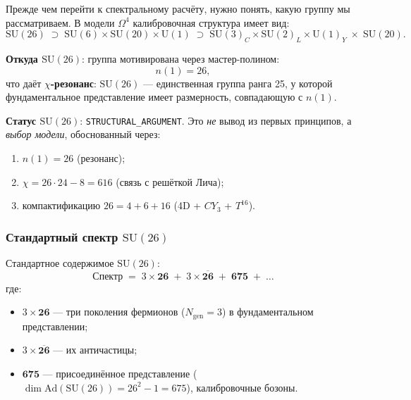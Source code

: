 \documentclass[11pt,a4paper]{article}
\newcommand{\SU}{\ensuremath{\mathrm{SU}}}
\newcommand{\Ad}{\ensuremath{\mathrm{Ad}}}
\newcommand{\CY}{\ensuremath{CY_3}}
\newcommand{\Om}{\ensuremath{\Omega^4}}
\newcommand{\Ngen}{\ensuremath{N_{\text{gen}}}}
\theoremstyle{definition}
\begin{document}
Прежде чем перейти к спектральному расчёту, нужно понять, какую
группу мы рассматриваем. В модели $\Om$ калибровочная структура
имеет вид:
\begin{equation}
    \SU(26) \;\supset\; \SU(6) \times \SU(20) \times \mathrm{U}(1)
    \;\supset\; \SU(3)_C \times \SU(2)_L \times \mathrm{U}(1)_Y
    \;\times\; \SU(20).
    \label{eq:su26-chain}
\end{equation}

\medskip\noindent
\textbf{Откуда $\SU(26)$}: группа мотивирована через
мастер-полином:
\begin{equation}
    n(1) = 26,
\end{equation}
что даёт \textbf{$\chi$-резонанс}: $\SU(26)$ --- единственная
группа ранга 25, у которой фундаментальное представление имеет
размерность, совпадающую с $n(1)$.

\medskip\noindent
\textbf{Статус $\SU(26)$}: \texttt{STRUCTURAL\_ARGUMENT}.
Это \emph{не} вывод из первых принципов, а \emph{выбор модели},
обоснованный через:
\begin{enumerate}
    \item $n(1) = 26$ (резонанс);
    \item $\chi = 26 \cdot 24 - 8 = 616$ (связь с решёткой Лича);
    \item компактификацию $26 = 4 + 6 + 16$ (4D + $\CY$ + $T^{16}$).
\end{enumerate}

\subsubsection{Стандартный спектр \texorpdfstring{$\SU(26)$}{(26)}}

Стандартное содержимое $\SU(26)$:
\begin{equation}
    \text{Спектр} \;=\; 3 \times \mathbf{26}
    \;+\; 3 \times \overline{\mathbf{26}}
    \;+\; \mathbf{675} \;+\; \ldots
    \label{eq:su26-spectrum}
\end{equation}
где:
\begin{itemize}
    \item $3 \times \mathbf{26}$ --- три поколения фермионов
          ($\Ngen = 3$) в фундаментальном представлении;
    \item $3 \times \overline{\mathbf{26}}$ --- их античастицы;
    \item $\mathbf{675}$ --- присоединённое представление
          ($\dim \Ad(\SU(26)) = 26^2 - 1 = 675$), калибровочные
          бозоны.
\end{itemize}
\end{document}
